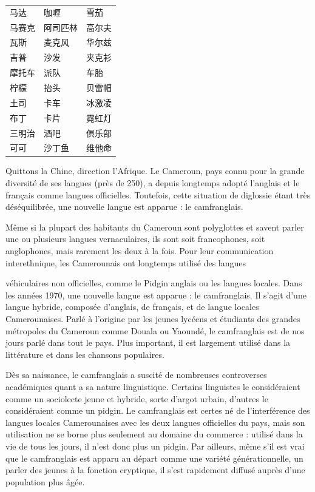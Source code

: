 \begin{center}
\renewcommand{\arraystretch}{1.18}
\begin{tabularx}{.92\linewidth}{@{}XXX@{}}
马达 & 咖喱 & 雪茄\\
马赛克 & 阿司匹林 & 高尔夫\\
瓦斯 & 麦克风 & 华尔兹\\
吉普 & 沙发 & 夹克衫\\
摩托车 & 派队 & 车胎\\
柠檬 & 抬头 & 贝雷帽\\
土司 & 卡车 & 冰激凌\\
布丁 & 卡片 & 霓虹灯\\
三明治 & 酒吧 & 俱乐部\\
可可 & 沙丁鱼 & 维他命\\
\end{tabularx}
\end{center}



Quittons la Chine, direction l’Afrique. Le Cameroun, pays connu pour la grande diversité de ses langues (près de 250), a depuis longtemps adopté l’anglais et le français comme langues officielles. Toutefois, cette situation de diglossie étant très déséquilibrée, une nouvelle langue est apparue : le camfranglais.



Même si la plupart des habitants du Cameroun sont polyglottes et savent parler une ou plusieurs langues vernaculaires, ils sont soit francophones, soit anglophones, mais rarement les deux à la fois. Pour leur communication interethnique, les Camerounais ont longtemps utilisé des langues



véhiculaires non officielles, comme le Pidgin anglais ou les langues locales. Dans les années 1970, une nouvelle langue est apparue : le camfranglais. Il s’agit d’une langue hybride, composée d’anglais, de français, et de langue locales Camerounaises. Parlé à l’origine par les jeunes lycéens et étudiants des grandes métropoles du Cameroun comme Douala ou Yaoundé, le camfranglais est de nos jours parlé dans tout le pays. Plus important, il est largement utilisé dans la littérature et dans les chansons populaires.



Dès sa naissance, le camfranglais a suscité de nombreuses controverses académiques quant a sa nature linguistique. Certains linguistes le considéraient comme un sociolecte jeune et hybride, sorte d’argot urbain, d’autres le considéraient comme un pidgin. Le camfranglais est certes né de l’interférence des langues locales Camerounaises avec les deux langues officielles du pays, mais son utilisation ne se borne plus seulement au domaine du commerce : utilisé dans la vie de tous les jours, il n’est donc plus un pidgin. Par ailleurs, même s’il est vrai que le camfranglais est apparu au départ comme une variété générationnelle, un parler des jeunes à la fonction cryptique, il s’est rapidement diffusé auprès d’une population plus âgée.


